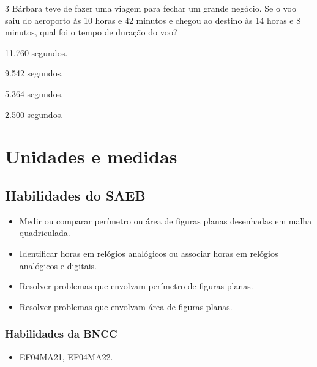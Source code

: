 \num{3} Bárbara teve de fazer uma viagem para fechar um grande negócio. Se o voo
saiu do aeroporto às 10 horas e 42 minutos e chegou ao destino às 14
horas e 8 minutos, qual foi o tempo de duração do voo?

\begin{multicols}{2}
\begin{escolha}
\item
  11.760 segundos.
\item
  9.542 segundos.
\item
  5.364 segundos.
\item
  2.500 segundos.
\end{escolha}
\end{multicols}

\chapter{Unidades e medidas}

\section*{Habilidades do SAEB}

\begin{itemize}
\item Medir ou comparar perímetro ou área de figuras planas desenhadas em
malha quadriculada.
\item Identificar horas em relógios analógicos ou associar horas em relógios
analógicos e digitais.
\item Resolver problemas que envolvam perímetro de figuras planas.
\item Resolver problemas que envolvam área de figuras planas.
\end{itemize}

\subsection{Habilidades da BNCC}

\begin{itemize}
\item EF04MA21, EF04MA22.
\end{itemize}

